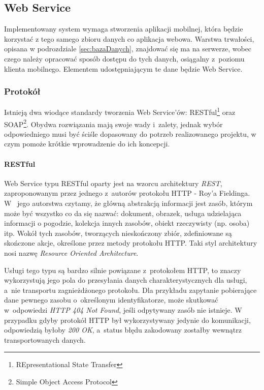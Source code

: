 \documentclass[11pt]{aghdpl}
\begin{document}
\subsection{Web Service}

Implementowany system wymaga stworzenia aplikacji mobilnej, która będzie korzystać z tego samego zbioru danych co aplikacja webowa. Warstwa trwałości, opisana w podrozdziale \ref{sec:bazaDanych}, znajdować się ma na serwerze, wobec czego należy opracować sposób dostępu do tych danych, osiągalny z~poziomu klienta mobilnego. Elementem udostępniającym te dane będzie Web Service.

\subsubsection{Protokół}

Istnieją dwa wiodące standardy tworzenia Web Service'ów: RESTful\footnote{REpresentational State Transfer} oraz SOAP\footnote{Simple Object Access Protocol}. Obydwa rozwiązania mają swoje wady i~zalety, jednak wybór odpowiedniego musi być ściśle dopasowany do potrzeb realizowanego projektu, w czym pomoże krótkie wprowadzenie do ich koncepcji.

\paragraph{RESTful}

Web Service typu RESTful oparty jest na wzorcu architektury \emph{REST}, zaproponowanym przez jednego z~autorów protokołu HTTP - Roy'a Fieldinga. W~\cite{RFD} jego autorstwa czytamy, że główną abstrakcją informacji jest zasób, którym może być wszystko co da się nazwać: dokument, obrazek, usługa udzielająca informacji o pogodzie, kolekcja innych zasobów, obiekt rzeczywisty (np. osoba) itp. Wokół tych zasobów, tworzących nieskończony zbiór, zdefiniowane są skończone akcje, określone przez metody protokołu HTTP. Taki styl architektury nosi nazwę \emph{Resource Oriented Architecture}.

Usługi tego typu są bardzo silnie powiązane z~protokołem HTTP, to znaczy wykorzystują jego pola do przesyłania danych charakterystycznych dla usługi, a~nie transportu zagnieżdżonego protokołu. Dla przykładu zapytanie pobierające dane pewnego zasobu o~określonym identyfikatorze, może skutkować w~odpowiedzi \emph{HTTP 404 Not Found}, jeśli odpytywany zasób nie istnieje. W przypadku gdyby protokół HTTP był wykorzystywany jedynie do komunikacji, odpowiedzią byłoby \emph{200 OK}, a~status błędu zakodowany zostałby wewnątrz transportowanych danych.
\end{document}
